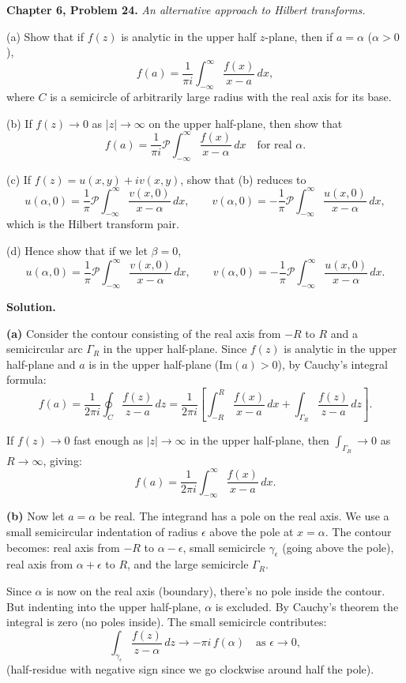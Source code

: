 \documentclass[12pt]{article}
\begin{document}
\textbf{Chapter 6, Problem 24.} \textit{An alternative approach to Hilbert transforms.}

(a) Show that if $f(z)$ is analytic in the upper half $z$-plane, then if $a = \alpha$ ($\alpha > 0$),
\[
f(a) = \frac{1}{\pi i}\int_{-\infty}^{\infty}\frac{f(x)}{x - a}\,dx,
\]
where $C$ is a semicircle of arbitrarily large radius with the real axis for its base.

(b) If $f(z) \to 0$ as $|z| \to \infty$ on the upper half-plane, then show that
\[
f(a) = \frac{1}{\pi i}\mathcal{P}\!\!\int_{-\infty}^{\infty}\frac{f(x)}{x-\alpha}\,dx \quad \text{for real } \alpha.
\]

(c) If $f(z) = u(x,y) + iv(x,y)$, show that (b) reduces to
\[
u(\alpha,0) = \frac{1}{\pi}\mathcal{P}\!\!\int_{-\infty}^{\infty}\frac{v(x,0)}{x-\alpha}\,dx, \qquad v(\alpha,0) = -\frac{1}{\pi}\mathcal{P}\!\!\int_{-\infty}^{\infty}\frac{u(x,0)}{x-\alpha}\,dx,
\]
which is the Hilbert transform pair.

(d) Hence show that if we let $\beta = 0$,
\[
u(\alpha,0) = \frac{1}{\pi}\mathcal{P}\!\!\int_{-\infty}^{\infty}\frac{v(x,0)}{x-\alpha}\,dx, \qquad v(\alpha,0) = -\frac{1}{\pi}\mathcal{P}\!\!\int_{-\infty}^{\infty}\frac{u(x,0)}{x-\alpha}\,dx.
\]

\bigskip
\textbf{Solution.}

\textbf{(a)} Consider the contour consisting of the real axis from $-R$ to $R$ and a semicircular arc $\Gamma_R$ in the upper half-plane. Since $f(z)$ is analytic in the upper half-plane and $a$ is in the upper half-plane ($\text{Im}(a) > 0$), by Cauchy's integral formula:
\[
f(a) = \frac{1}{2\pi i}\oint_C \frac{f(z)}{z-a}\,dz = \frac{1}{2\pi i}\left[\int_{-R}^{R}\frac{f(x)}{x-a}\,dx + \int_{\Gamma_R}\frac{f(z)}{z-a}\,dz\right].
\]

If $f(z) \to 0$ fast enough as $|z| \to \infty$ in the upper half-plane, then $\int_{\Gamma_R} \to 0$ as $R \to \infty$, giving:
\[
f(a) = \frac{1}{2\pi i}\int_{-\infty}^{\infty}\frac{f(x)}{x-a}\,dx.
\]

\textbf{(b)} Now let $a = \alpha$ be real. The integrand has a pole on the real axis. We use a small semicircular indentation of radius $\epsilon$ above the pole at $x = \alpha$. The contour becomes: real axis from $-R$ to $\alpha-\epsilon$, small semicircle $\gamma_\epsilon$ (going above the pole), real axis from $\alpha+\epsilon$ to $R$, and the large semicircle $\Gamma_R$.

Since $\alpha$ is now on the real axis (boundary), there's no pole inside the contour. But indenting into the upper half-plane, $\alpha$ is excluded. By Cauchy's theorem the integral is zero (no poles inside). The small semicircle contributes:
\[
\int_{\gamma_\epsilon}\frac{f(z)}{z-\alpha}\,dz \to -\pi i\,f(\alpha) \quad \text{as } \epsilon \to 0,
\]
(half-residue with negative sign since we go clockwise around half the pole).
\end{document}
